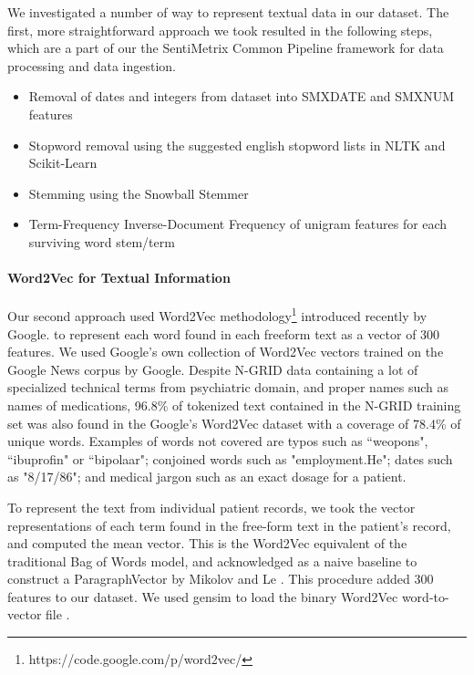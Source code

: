  We investigated a number of way to represent textual data in our dataset. The first, more straightforward approach we took resulted in the following steps,
 which are a part of our the SentiMetrix Common Pipeline framework for data processing and
 data ingestion.
 
 \begin{itemize}
     \item Removal of dates and integers from dataset into \textsf{SMXDATE} and \textsf{SMXNUM} features
     \item Stopword removal using the suggested english stopword lists in NLTK \cite{nltk} and Scikit-Learn \cite{scikit-learn}
     \item Stemming using the Snowball Stemmer \cite{snowball}
     
     \item Term-Frequency Inverse-Document Frequency \cite{tf-idf,ir-textbook} of unigram features for each surviving word stem/term
     
\end{itemize}

 
 \paragraph{Word2Vec for Textual Information} Our second approach used
 \textsf{Word2Vec} 
 methodology\footnote{https://code.google.com/p/word2vec/} \cite{word2vec} introduced
 recently by Google.
to represent each word found in each freeform text as a vector of 300 features.
We used Google's own collection of Word2Vec vectors trained on the Google News
corpus by Google. Despite N-GRID data containing a lot of
specialized technical terms from psychiatric domain, and proper names such as
names of medications, 96.8\% of tokenized text contained in the N-GRID training set
was also found in the Google's \textsf{Word2Vec} dataset with a coverage of 78.4\% of unique words. Examples of
words not covered are typos such as \textsf{``weopons"}, \textsf{``ibuprofin"} or \textsf{``bipolaar"}; conjoined words such as \textsf{"employment.He"}; dates such as \textsf{"8/17/86"}; and medical jargon such as an exact dosage for a patient.

To represent the text from individual patient records, we took the vector
representations of each term found in the free-form text in the patient's record,
and computed the mean vector. This is the Word2Vec 
equivalent of the traditional Bag of Words model, and acknowledged as a naive baseline to construct a
\textsf{ParagraphVector} by Mikolov and Le \cite{doc2vec}.  This procedure added 300 features to our dataset. We used gensim to load the binary Word2Vec word-to-vector file \cite{gensim}. 
 
